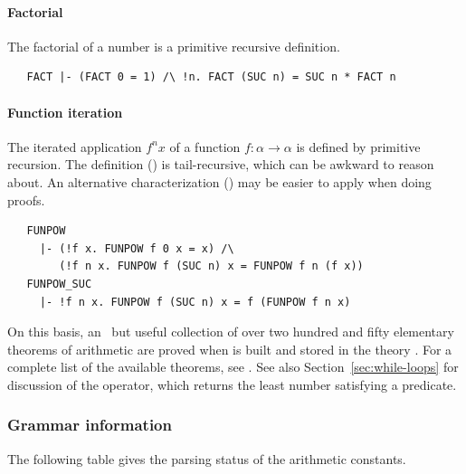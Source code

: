 \paragraph{Factorial}

The factorial of a number is a primitive recursive definition.
%
\begin{hol}
\begin{verbatim}
   FACT |- (FACT 0 = 1) /\ !n. FACT (SUC n) = SUC n * FACT n
\end{verbatim}
\end{hol}

\paragraph{Function iteration}

The iterated application $f^n x$ of a function $f : \alpha \to
\alpha$ is defined by primitive recursion. The definition
() is tail-recursive, which can be awkward to reason
about. An alternative characterization () may be easier
to apply when doing proofs.
%
\begin{hol}
\begin{verbatim}
   FUNPOW
     |- (!f x. FUNPOW f 0 x = x) /\
        (!f n x. FUNPOW f (SUC n) x = FUNPOW f n (f x))
   FUNPOW_SUC
     |- !f n x. FUNPOW f (SUC n) x = f (FUNPOW f n x)
\end{verbatim}
\end{hol}

\medskip

On this basis, an \adhoc\ but useful collection of over two hundred
and fifty elementary theorems of arithmetic are proved when \HOL{} is
built and stored in the theory \theoryimp{arithmetic}.  For a complete
list of the available theorems, see \REFERENCE.  See also
Section~\ref{sec:while-loops} for discussion of the 
operator, which returns the least number satisfying a predicate.

\subsubsection{Grammar information}

The following table gives the parsing status of the arithmetic
constants.

